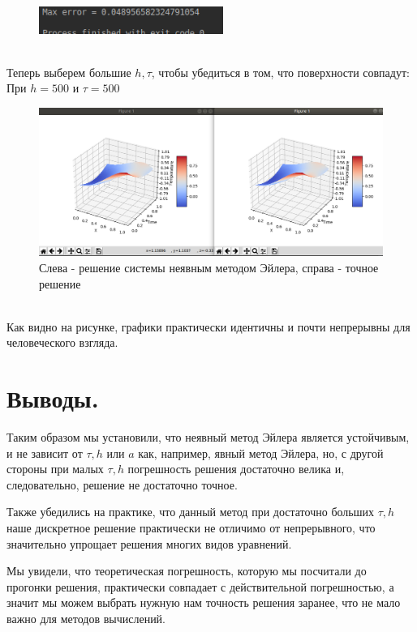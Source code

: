 \documentclass[12pt,a4paper]{scrartcl}
\begin{document}
\begin{figure}[h]
    \centering
    \includegraphics[width=6cm]{error2.png}
\end{figure}
\\
Теперь выберем большие $h,\tau$, чтобы убедиться в том, что поверхности совпадут: \\
При $h = 500$ и $\tau = 500$ \\
\begin{figure}[h]
    \centering
    \includegraphics[width=14cm]{t500h500.png}
    \caption{Слева - решение системы неявным методом Эйлера,
                справа - точное решение}
\end{figure}
\\
Как видно на рисунке, графики практически идентичны и почти непрерывны для человеческого взгляда.

\section{Выводы.}
Таким образом мы установили, что неявный метод Эйлера является устойчивым, и не зависит от $\tau,h$ или $a$ как, например, явный метод Эйлера, но, с другой стороны при малых $\tau, h$ погрешность решения достаточно велика и, следовательно, решение не достаточно точное.

Также убедились на практике, что данный метод при достаточно больших $\tau, h$ наше дискретное решение практически не отличимо от непрерывного, что значительно упрощает решения многих видов уравнений.

Мы увидели, что теоретическая погрешность, которую мы посчитали до прогонки решения, практически совпадает с действительной погрешностью, а значит мы можем выбрать нужную нам точность решения заранее, что не мало важно для методов вычислений.
\end{document}
